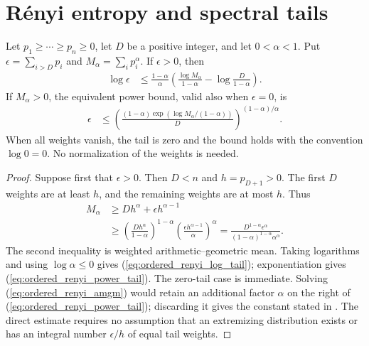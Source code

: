 \section{Rényi entropy and spectral tails}

\begin{theorem}
    \label{thm:ordered_renyi_tail}
    \leanok
    Let $p_1\geq\cdots\geq p_n\geq0$, let $D$ be a positive integer,
    and let $0<\alpha<1$. Put $\epsilon=\sum_{i>D}p_i$ and
    $M_\alpha=\sum_i p_i^\alpha$. If $\epsilon>0$, then
    \begin{align}
        \log\epsilon
         & \leq \frac{1-\alpha}{\alpha}
        \left(\frac{\log M_\alpha}{1-\alpha}
        -\log\frac{D}{1-\alpha}\right).
        \label{eq:ordered_renyi_log_tail}
    \end{align}
    If $M_\alpha>0$, the equivalent power bound, valid also when
    $\epsilon=0$, is
    \begin{align}
        \epsilon
         & \leq\left(\frac{(1-\alpha)
                         \exp(\log M_\alpha/(1-\alpha))}{D}\right)^{(1-\alpha)/\alpha}.
        \label{eq:ordered_renyi_power_tail}
    \end{align}
    When all weights vanish, the tail is zero and the bound holds with
    the convention $\log0=0$. No normalization of the weights is needed.
\end{theorem}
\begin{proof}
    \leanok
    Suppose first that $\epsilon>0$. Then $D<n$ and $h=p_{D+1}>0$.
    The first $D$ weights are at least $h$, and the remaining weights
    are at most $h$. Thus
    \begin{align}
        M_\alpha
         & \geq D h^\alpha+\epsilon h^{\alpha-1}                   \\
         & \geq\left(\frac{D h^\alpha}{1-\alpha}\right)^{1-\alpha}
        \left(\frac{\epsilon h^{\alpha-1}}{\alpha}\right)^\alpha
        =\frac{D^{1-\alpha}\epsilon^\alpha}
         {(1-\alpha)^{1-\alpha}\alpha^\alpha}.
        \label{eq:ordered_renyi_amgm}
    \end{align}
    The second inequality is weighted arithmetic--geometric mean.
    Taking logarithms and using $\log\alpha\leq0$ gives
    (\ref{eq:ordered_renyi_log_tail}); exponentiation gives
    (\ref{eq:ordered_renyi_power_tail}). The zero-tail case is immediate.
    Solving (\ref{eq:ordered_renyi_amgm}) would retain an additional
    factor $\alpha$ on the right of (\ref{eq:ordered_renyi_power_tail});
    discarding it gives the constant stated in
    \cite[Lemma~2]{VerstraeteCirac2006Faithfully}.
    The direct estimate requires no assumption that an extremizing
    distribution exists or has an integral number $\epsilon/h$ of equal
    tail weights.
\end{proof}


